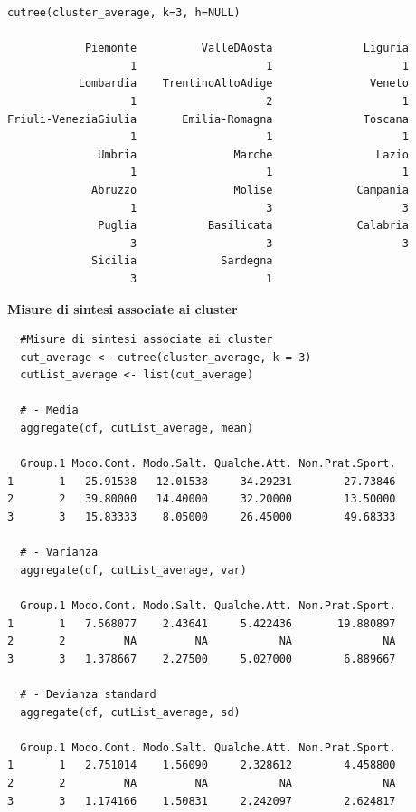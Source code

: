 \vspace{5mm}
\begin{lstlisting}
cutree(cluster_average, k=3, h=NULL)

            Piemonte          ValleDAosta              Liguria 
                   1                    1                    1 
           Lombardia    TrentinoAltoAdige               Veneto 
                   1                    2                    1 
Friuli-VeneziaGiulia       Emilia-Romagna              Toscana 
                   1                    1                    1 
              Umbria               Marche                Lazio 
                   1                    1                    1 
             Abruzzo               Molise             Campania 
                   1                    3                    3 
              Puglia           Basilicata             Calabria 
                   3                    3                    3 
             Sicilia             Sardegna 
                   3                    1 
\end{lstlisting}
\vspace{5mm}

\noindent \textbf{Misure di sintesi associate ai cluster}

\vspace{5mm}
\begin{lstlisting}
  #Misure di sintesi associate ai cluster
  cut_average <- cutree(cluster_average, k = 3)
  cutList_average <- list(cut_average)

  # - Media
  aggregate(df, cutList_average, mean)

  Group.1 Modo.Cont. Modo.Salt. Qualche.Att. Non.Prat.Sport.
1       1   25.91538   12.01538     34.29231        27.73846
2       2   39.80000   14.40000     32.20000        13.50000
3       3   15.83333    8.05000     26.45000        49.68333

  # - Varianza
  aggregate(df, cutList_average, var)

  Group.1 Modo.Cont. Modo.Salt. Qualche.Att. Non.Prat.Sport.
1       1   7.568077    2.43641     5.422436       19.880897
2       2         NA         NA           NA              NA
3       3   1.378667    2.27500     5.027000        6.889667

  # - Devianza standard
  aggregate(df, cutList_average, sd)

  Group.1 Modo.Cont. Modo.Salt. Qualche.Att. Non.Prat.Sport.
1       1   2.751014    1.56090     2.328612        4.458800
2       2         NA         NA           NA              NA
3       3   1.174166    1.50831     2.242097        2.624817
\end{lstlisting}
\vspace{5mm}

